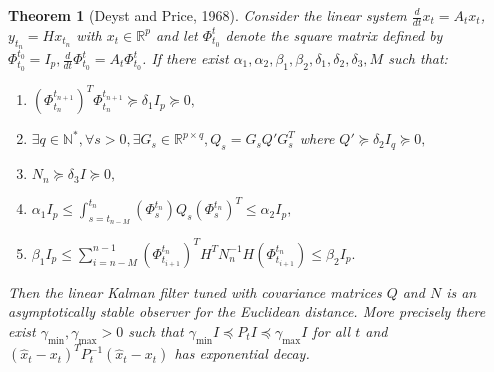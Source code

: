 \documentclass[a4paper,12pt,onecolumn]{article}
\newtheorem{thm}{Theorem}
\newcommand{\RR}{{\mathbb{R}}}
\newcommand{\NN}{{\mathbb N}}
\newcommand{\dotex}{{\frac{d}{dt}}}
\begin{document}
\begin{thm}[Deyst and Price, 1968]
\label{thm::Deyst_Price}Consider the  linear system $\dotex x_t=A_t x_t$, $y_{t_n}=Hx_{t_n}$ with $x_t \in \RR^p$ and let $\Phi_{{t_0}}^{t}$ denote the square matrix defined by $\Phi_{t_0}^{t_0}=I_p, \frac{d}{dt} \Phi_{t_0}^t = A_t \Phi_{t_0}^t$.
If there exist $\alpha_1,\alpha_2,\beta_1,\beta_2,\delta_1,\delta_2,\delta_3,M$ such that: 
\begin{enumerate}[i]
\item $(\Phi_{t_n}^{t_{n+1}})^T \Phi_{t_n}^{t_{n+1}} \succeq \delta_1 I_p \succeq 0,$ \label{cond::Psi}
\item $\exists q \in \NN^{*},\forall s >0, \exists G_s \in \RR^{p \times q}, Q_s=G_s Q'G_s^T$ where $Q' \succeq \delta_2 I_q \succeq 0,$ \label{cond::Q}
\item $N_n \succeq \delta_3 I \succeq 0,$ \label{cond::R}
\item $\alpha_1 I_p \leq \int_{s=t_{n-M}}^{t_n} \left( \Phi_s^{t_n} \right) Q_s \left( \Phi_s^{t_n} \right)^T \leq \alpha_2 I_p,$ \label{cond::reachable}
\item $\beta_1 I_p \leq \sum_{i=n-M}^{n-1} \left( \Phi^{t_n}_{t_{i+1}} \right)^T H^TN_n^{-1}H \left( \Phi^{t_n}_{t_{i+1}} \right) \leq \beta_2 I_p.$ \label{cond::observable}
\end{enumerate}
Then the linear Kalman filter tuned with covariance matrices $Q$ and $N$ is an asymptotically stable observer for the Euclidean distance. More precisely there exist $\gamma_{\text{min}},\gamma_{\text{max}}>0$ such that $\gamma_{\text{min}} I\preceq P_t I\preceq\gamma_{\text{max}}I$ for all $t$ and $(\hat x_t-x_t)^TP_t^{-1}(\hat x_t-x_t)$ has  exponential decay.
\end{thm}
\end{document}
